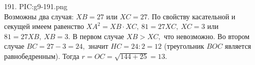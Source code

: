 191. {{PIC:g9-191.png}}\\
Возможны два случая: $XB=27$ или $XC=27.$ По свойству касательной и секущей имеем равенство $XA^2=XB\cdot XC,\ 81=27XC,\ XC=3$ или $81=27XB,\ XB=3.$ В первом случае $XB>XC,$ что невозможно. Во втором случае $BC=27-3=24,$ значит $HC=24:2=12$ (треугольник $BOC$ является равнобедренным). Тогда $r=OC=\sqrt{144+25}=13.$\\
